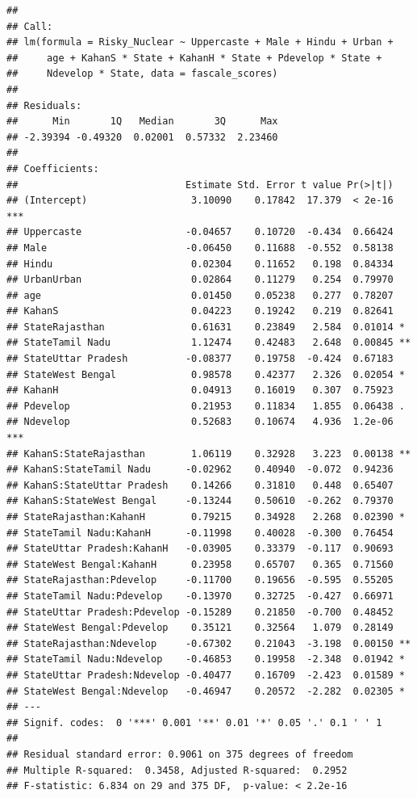 \documentclass[
]{article}
\begin{document}
\begin{verbatim}
## 
## Call:
## lm(formula = Risky_Nuclear ~ Uppercaste + Male + Hindu + Urban + 
##     age + KahanS * State + KahanH * State + Pdevelop * State + 
##     Ndevelop * State, data = fascale_scores)
## 
## Residuals:
##      Min       1Q   Median       3Q      Max 
## -2.39394 -0.49320  0.02001  0.57332  2.23460 
## 
## Coefficients:
##                             Estimate Std. Error t value Pr(>|t|)    
## (Intercept)                  3.10090    0.17842  17.379  < 2e-16 ***
## Uppercaste                  -0.04657    0.10720  -0.434  0.66424    
## Male                        -0.06450    0.11688  -0.552  0.58138    
## Hindu                        0.02304    0.11652   0.198  0.84334    
## UrbanUrban                   0.02864    0.11279   0.254  0.79970    
## age                          0.01450    0.05238   0.277  0.78207    
## KahanS                       0.04223    0.19242   0.219  0.82641    
## StateRajasthan               0.61631    0.23849   2.584  0.01014 *  
## StateTamil Nadu              1.12474    0.42483   2.648  0.00845 ** 
## StateUttar Pradesh          -0.08377    0.19758  -0.424  0.67183    
## StateWest Bengal             0.98578    0.42377   2.326  0.02054 *  
## KahanH                       0.04913    0.16019   0.307  0.75923    
## Pdevelop                     0.21953    0.11834   1.855  0.06438 .  
## Ndevelop                     0.52683    0.10674   4.936  1.2e-06 ***
## KahanS:StateRajasthan        1.06119    0.32928   3.223  0.00138 ** 
## KahanS:StateTamil Nadu      -0.02962    0.40940  -0.072  0.94236    
## KahanS:StateUttar Pradesh    0.14266    0.31810   0.448  0.65407    
## KahanS:StateWest Bengal     -0.13244    0.50610  -0.262  0.79370    
## StateRajasthan:KahanH        0.79215    0.34928   2.268  0.02390 *  
## StateTamil Nadu:KahanH      -0.11998    0.40028  -0.300  0.76454    
## StateUttar Pradesh:KahanH   -0.03905    0.33379  -0.117  0.90693    
## StateWest Bengal:KahanH      0.23958    0.65707   0.365  0.71560    
## StateRajasthan:Pdevelop     -0.11700    0.19656  -0.595  0.55205    
## StateTamil Nadu:Pdevelop    -0.13970    0.32725  -0.427  0.66971    
## StateUttar Pradesh:Pdevelop -0.15289    0.21850  -0.700  0.48452    
## StateWest Bengal:Pdevelop    0.35121    0.32564   1.079  0.28149    
## StateRajasthan:Ndevelop     -0.67302    0.21043  -3.198  0.00150 ** 
## StateTamil Nadu:Ndevelop    -0.46853    0.19958  -2.348  0.01942 *  
## StateUttar Pradesh:Ndevelop -0.40477    0.16709  -2.423  0.01589 *  
## StateWest Bengal:Ndevelop   -0.46947    0.20572  -2.282  0.02305 *  
## ---
## Signif. codes:  0 '***' 0.001 '**' 0.01 '*' 0.05 '.' 0.1 ' ' 1
## 
## Residual standard error: 0.9061 on 375 degrees of freedom
## Multiple R-squared:  0.3458, Adjusted R-squared:  0.2952 
## F-statistic: 6.834 on 29 and 375 DF,  p-value: < 2.2e-16
\end{verbatim}
\end{document}

